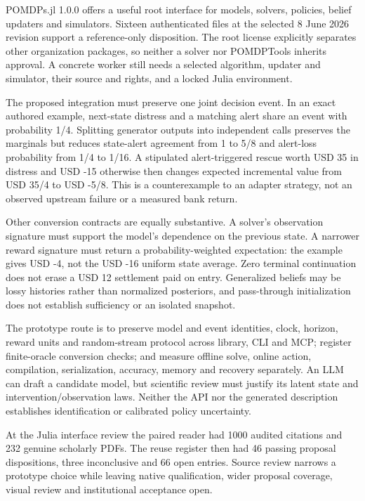 POMDPs.jl 1.0.0 offers a useful root interface for models, solvers,
policies, belief updaters and simulators. Sixteen authenticated files at
the selected 8 June 2026 revision support a reference-only disposition.
The root license explicitly separates other organization packages, so
neither a solver nor POMDPTools inherits approval. A concrete worker
still needs a selected algorithm, updater and simulator, their source
and rights, and a locked Julia environment.
\citep{exec23_pomdpsjl_sources}

The proposed integration must preserve one joint decision event. In an
exact authored example, next-state distress and a matching alert share
an event with probability 1/4. Splitting generator outputs into
independent calls preserves the marginals but reduces state-alert
agreement from 1 to 5/8 and alert-loss probability from 1/4 to 1/16. A
stipulated alert-triggered rescue worth USD 35 in distress and USD -15
otherwise then changes expected incremental value from USD 35/4 to USD
-5/8. This is a counterexample to an adapter strategy, not an observed
upstream failure or a measured bank return.
\citep{exec23_pomdpsjl_reference}

Other conversion contracts are equally substantive. A solver's
observation signature must support the model's dependence on the
previous state. A narrower reward signature must return a
probability-weighted expectation: the example gives USD -4, not the USD
-16 uniform state average. Zero terminal continuation does not erase a
USD 12 settlement paid on entry. Generalized beliefs may be lossy
histories rather than normalized posteriors, and pass-through
initialization does not establish sufficiency or an isolated snapshot.
\citep{exec23_pomdpsjl_sources,exec23_pomdpsjl_reference}

The prototype route is to preserve model and event identities, clock,
horizon, reward units and random-stream protocol across library, CLI and
MCP; register finite-oracle conversion checks; and measure offline
solve, online action, compilation, serialization, accuracy, memory and
recovery separately. An LLM can draft a candidate model, but scientific
review must justify its latent state and intervention/observation laws.
Neither the API nor the generated description establishes identification
or calibrated policy uncertainty. \citep{exec23_pomdpsjl_sources}

At the Julia interface review the paired reader had 1000 audited
citations and 232 genuine scholarly PDFs. The reuse register then had 46
passing proposal dispositions, three inconclusive and 66 open entries.
Source review narrows a prototype choice while leaving native
qualification, wider proposal coverage, visual review and institutional
acceptance open. \citep{sp23pomdpsjl_reader,sp23pomdpsjl_progress}

